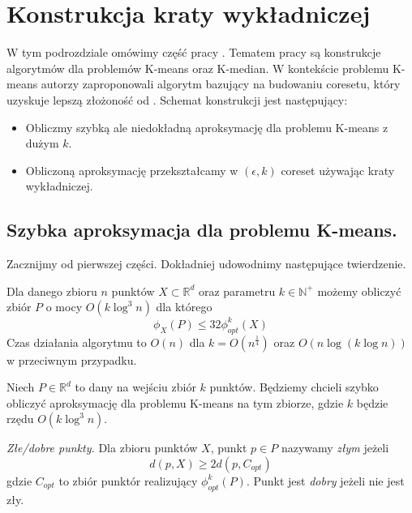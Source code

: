 \section{Konstrukcja kraty wykładniczej}

W tym podrozdziale omówimy część pracy \cite{10.1145/1007352.1007400}.
Tematem pracy są konstrukcje algorytmów dla problemów K-means oraz K-median.
W kontekście problemu K-means autorzy zaproponowali algorytm bazujący na budowaniu coresetu, który uzyskuje lepszą złożoność od \cite{Matousek99onapproximate}.
Schemat konstrukcji jest następujący:
\begin{itemize}
    \item Obliczmy szybką ale niedokładną aproksymację dla problemu K-means z dużym $k$.
    \item Obliczoną aproksymację przekształcamy w $(\epsilon, k)$ coreset używając kraty wykładniczej.
\end{itemize}


\subsection{Szybka aproksymacja dla problemu K-means.}
\noindent
Zacznijmy od pierwszej części.
Dokładniej udowodnimy następujące twierdzenie.

\begin{thm}{\cite{10.1145/1007352.1007400}}
    Dla danego zbioru $n$ punktów $X \subset \mathbb{R}^d$ oraz parametru $k \in \mathbb{N}^{+}$ możemy 
    obliczyć zbiór $P$ o mocy $O(k \log^{3}n)$ dla którego 
    \begin{equation}
        \phi_{X}(P) \leq 32 \phi_{opt}^{k}(X)
    \end{equation}
    Czas działania algorytmu to $O(n)$ dla $k = O(n^{\frac{1}{4}})$ oraz $O(n \log (k \log n))$ w przeciwnym przypadku.
\end{thm}


\noindent
Niech $P \in \mathbb{R}^{d}$ to dany na wejściu zbiór $k$ punktów.
Będziemy chcieli szybko obliczyć aproksymację dla problemu K-means na tym zbiorze, gdzie $k$ będzie rzędu $O(k \log^{3}n)$.

\begin{definition}
    \emph{Złe/dobre punkty.} Dla zbioru punktów $X$, punkt $p \in P$ nazywamy \textit{złym} jeżeli
    \begin{equation}
        d(p, X) \geq 2d(p, C_{opt})
    \end{equation}
    gdzie $C_{opt}$ to zbiór punktór realizujący $\phi_{opt}^{k}(P)$.
    Punkt jest \textit{dobry} jeżeli nie jest zły.
\end{definition}

